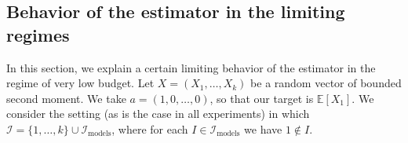\documentclass{article} %
\newcommand{\charlie}[1]{ {\color{red}[CCB: #1]}}
\newtheorem{theorem}{Theorem}
\newcommand{\wh}[1]{\widehat{#1}}
\newcommand{\ul}[1]{\underline{#1}}
\DeclareMathOperator{\classical}{classical}
\begin{document}





\subsection{Behavior of the estimator in the limiting regimes}\label{sec:limiting}

In this section, we explain a certain limiting behavior of the estimator in the regime of very low budget. Let $X=(X_1,\dots,X_k)$ be a random vector of bounded second moment. We take $a=(1,0,\dots,0)$, so that our target is $\mathbb{E}[X_1]$. We consider the setting (as is the case in all experiments) in which $\mathcal{I}=\{1,\dots,k\}\cup \mathcal{I}_{\text{models}}$, where for each $I\in\mathcal{I}_{\text{models}}$ we have $1\not\in I$.
\end{document}
